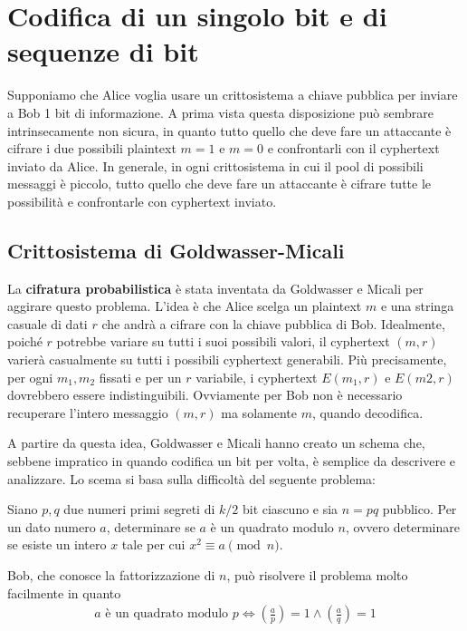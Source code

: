 \chapter{Codifica di un singolo bit e di sequenze di bit}
\label{chapter6}

Supponiamo che Alice voglia usare un crittosistema a chiave pubblica per inviare a Bob 1 bit di informazione. A prima vista questa disposizione può sembrare intrinsecamente non sicura, in quanto tutto quello che deve fare un attaccante è cifrare i due possibili plaintext $m = 1$ e $m = 0$ e confrontarli con il cyphertext inviato da Alice. In generale, in ogni crittosistema in cui il pool di possibili messaggi è piccolo, tutto quello che deve fare un attaccante è cifrare tutte le possibilità e confrontarle con cyphertext inviato. 

\section{Crittosistema di Goldwasser-Micali}
La \textbf{cifratura probabilistica} è stata inventata da Goldwasser e Micali per aggirare questo problema. L'idea è che Alice scelga un plaintext $m$ e una stringa casuale di dati $r$ che andrà a cifrare con la chiave pubblica di Bob. Idealmente, poiché $r$ potrebbe variare su tutti i suoi possibili valori, il cyphertext $(m, r)$ varierà casualmente su tutti i possibili cyphertext generabili. Più precisamente, per ogni $m_1, m_2$ fissati e per un $r$ variabile, i cyphertext $E(m_1, r)$ e $E(m2, r)$ dovrebbero essere indistinguibili. Ovviamente per Bob non è necessario recuperare l'intero messaggio $(m, r)$ ma solamente $m$, quando decodifica.

A partire da questa idea, Goldwasser e Micali hanno creato un schema che, sebbene impratico in quando codifica un bit per volta, è semplice da descrivere e analizzare. Lo scema si basa sulla difficoltà del seguente problema:

\begin{definition}
Siano \(p, q\) due numeri primi segreti di $k/2$ bit ciascuno e sia \(n = pq\) pubblico. Per un dato numero \(a\), determinare se \(a\) è un quadrato modulo \(n\), ovvero determinare se esiste un intero \(x\) tale per cui \(x^2 \equiv a \pmod n\).
\end{definition}

\noindent Bob, che conosce la fattorizzazione di $n$, può risolvere il problema molto facilmente in quanto 
\begin{align*}
    a \text{ è un quadrato modulo } p \Longleftrightarrow \left( \frac{a}{p}\right) = 1 \land \left( \frac{a}{q}\right) = 1 
\end{align*}

